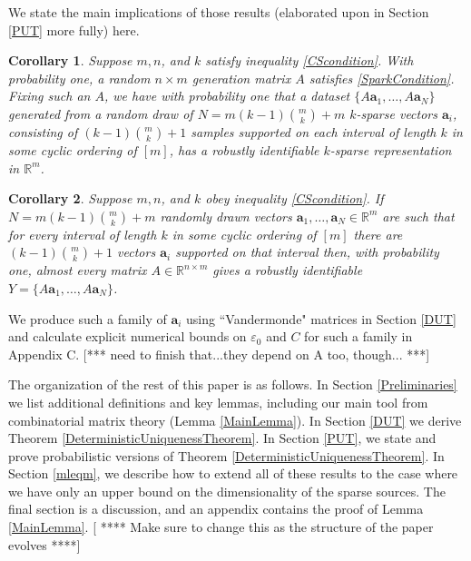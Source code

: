 \documentclass[journal, onecolumn]{IEEEtran}
\newtheorem{corollary}{Corollary}
\begin{document}
We state the main implications of those results (elaborated upon in Section \ref{PUT} more fully) here. %

\begin{corollary}
Suppose $m, n$, and $k$ satisfy inequality \eqref{CScondition}. With probability one, a random $n \times m$ generation matrix $A$ satisfies \eqref{SparkCondition}. Fixing such an $A$, we have with probability one that a dataset $\{A\mathbf{a}_1, \ldots , A\mathbf{a}_N\}$ generated from a random draw of $N = m(k-1){m \choose k}+m$ $k$-sparse vectors $\mathbf{a}_i$, consisting of $(k-1){m \choose k}+1$ samples supported on each interval of length $k$ in some cyclic ordering of $[m]$, has a robustly identifiable $k$-sparse representation in $\mathbb{R}^m$.
\end{corollary}

\begin{corollary}
Suppose $m, n$, and $k$ obey inequality \eqref{CScondition}.  If $N = m(k-1){m \choose k}+m$ randomly drawn vectors $\mathbf{a}_1, \ldots, \mathbf{a}_N \in \mathbb{R}^m$ are such that for every interval of length $k$ in some cyclic ordering of $[m]$ there are $(k-1){m \choose k}+1$ vectors $\mathbf{a}_i$ supported on that interval then, with probability one, almost every matrix $A \in \mathbb{R}^{n \times m}$ gives a robustly identifiable $Y = \{A\mathbf{a}_1, \ldots , A\mathbf{a}_N \}$.
\end{corollary}




We produce such a family of $\mathbf{a}_i$ using ``Vandermonde" matrices in Section \ref{DUT} and calculate explicit numerical bounds on $\varepsilon_0$ and $C$ for such a family in Appendix C. [*** need to finish that...they depend on A too, though... ***] 


The organization of the rest of this paper is as follows. In Section \ref{Preliminaries} we list additional definitions and key lemmas, including our main tool from combinatorial matrix theory (Lemma \ref{MainLemma}). In Section \ref{DUT} we derive Theorem \ref{DeterministicUniquenessTheorem}. In Section \ref{PUT}, we state and prove probabilistic versions of Theorem \ref{DeterministicUniquenessTheorem}. In Section \ref{mleqm}, we describe how to extend all of these results to the case where we have only an upper bound on the dimensionality of the sparse sources. The final section is a discussion, and an appendix contains the proof of Lemma \ref{MainLemma}.
[ **** Make sure to change this as the structure of the paper evolves ****]
\end{document}
